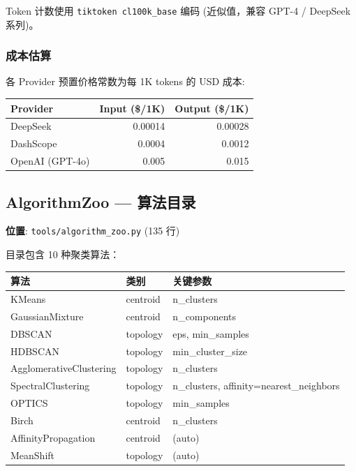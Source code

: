 \documentclass[12pt,a4paper]{article}
\begin{document}
Token 计数使用 \texttt{tiktoken cl100k\_base} 编码 (近似值，兼容 GPT-4 / DeepSeek 系列)。

\subsubsection{成本估算}

各 Provider 预置价格常数为每 1K tokens 的 USD 成本:

\begin{table}[H]
\centering
\begin{tabular}{@{}lrr@{}}
\toprule
\textbf{Provider} & \textbf{Input (\$/1K)} & \textbf{Output (\$/1K)} \\
\midrule
DeepSeek & 0.00014 & 0.00028 \\
DashScope & 0.0004 & 0.0012 \\
OpenAI (GPT-4o) & 0.005 & 0.015 \\
\bottomrule
\end{tabular}
\end{table}

\subsection{AlgorithmZoo --- 算法目录}

\textbf{位置}: \texttt{tools/algorithm\_zoo.py} (135 行)

目录包含 10 种聚类算法：

\begin{table}[H]
\centering
\begin{tabular}{@{}lll@{}}
\toprule
\textbf{算法} & \textbf{类别} & \textbf{关键参数} \\
\midrule
KMeans & centroid & n\_clusters \\
GaussianMixture & centroid & n\_components \\
DBSCAN & topology & eps, min\_samples \\
HDBSCAN & topology & min\_cluster\_size \\
AgglomerativeClustering & topology & n\_clusters \\
SpectralClustering & topology & n\_clusters, affinity=nearest\_neighbors \\
OPTICS & topology & min\_samples \\
Birch & centroid & n\_clusters \\
AffinityPropagation & centroid & (auto) \\
MeanShift & topology & (auto) \\
\bottomrule
\end{tabular}
\end{table}
\end{document}
